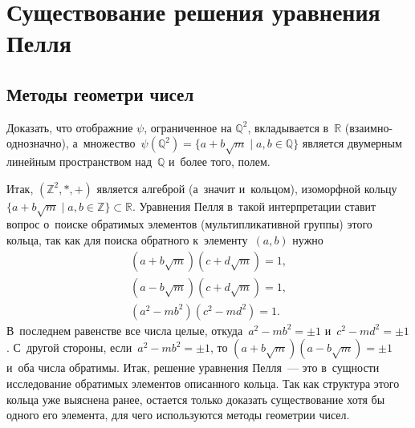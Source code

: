 \documentclass{article}
\begin{document}
\section{Существование решения уравнения Пелля}

\subsection{Методы геометри чисел}

\begin{exercise}
  Доказать, что отображние $\psi$, ограниченное на $\mathbb{Q}^2$,
  вкладывается в~$\mathbb{R}$ (взаимно-однозначно),
  а~множество~$\psi(\mathbb{Q}^2) = \{a + b\sqrt{m} \mid a, b \in
  \mathbb{Q}\}$ является двумерным линейным пространством над~$\mathbb{Q}$
  и~более того, полем.
\end{exercise}

Итак, $(\mathbb{Z}^2, \ast, +)$ является алгеброй (а~значит и~кольцом),
изоморфной кольцу~$\{a + b\sqrt{m} \mid a, b \in \mathbb{Z}\} \subset
\mathbb{R}$. Уравнения Пелля в~такой интерпретации ставит вопрос
о~поиске обратимых элементов (мультипликативной группы) этого кольца, так как
для поиска обратного к~элементу~$(a, b)$ нужно
\begin{gather*}
  (a + b\sqrt{m})(c + d\sqrt{m}) = 1,\\
  (a - b\sqrt{m})(c + d\sqrt{m}) = 1,\\
  (a^2 - mb^2)(c^2 - md^2) = 1.
\end{gather*}
В~последнем равенстве все числа целые, откуда~$a^2 - mb^2 = \pm 1$
и~$c^2 - md^2 = \pm 1$. С~другой стороны, если~$a^2 - mb^2 = \pm 1$, то
$(a + b\sqrt{m})(a - b\sqrt{m}) = \pm 1$ и~оба числа обратимы. Итак, решение
уравнения Пелля~--- это в~сущности исследование обратимых элементов описанного
кольца. Так как структура этого кольца уже выяснена ранее, остается только
доказать существование хотя бы одного его элемента, для чего используются методы
геометрии чисел.
\end{document}
